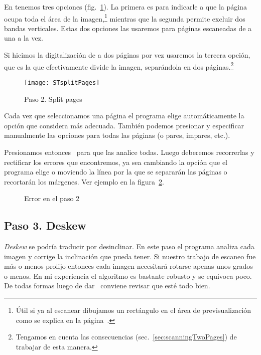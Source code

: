 \documentclass[%
	a5paper,
	10pt,
	twoside,
	openright,
	final,
]{memoir}
\begin{document}
{	En  tenemos tres opciones (fig.~\ref{fig:STsplitPages}). La primera es para indicarle a \scantailor que la página ocupa toda el área de la imagen,\footnote{Útil si ya al escanear dibujamos un rectángulo en el área de previsualización como se explica en la página~\pageref{pag:scanningRegionSelection}.} mientras que la segunda permite excluir dos bandas verticales. Estas dos opciones las usaremos para páginas escaneadas de a una a la vez.

	Si hicimos la digitalización de a dos páginas por vez usaremos la tercera opción, que es la que efectivamente divide la imagen, separándola en dos páginas.\footnote{Tengamos en cuenta las consecuencias (sec.~\ref{sec:scanningTwoPages}) de trabajar de esta manera.}

	\begin{figure}
		\centering
		\texttt{[image: STsplitPages]}
		\caption{Paso 2. Split pages\label{fig:STsplitPages}}
	\end{figure}

	Cada vez que seleccionamos una página el programa elige automáticamente la opción que considera más adecuada. También podemos presionar  y especificar manualmente las opciones para todas las páginas (o pares, impares, etc.).

	Presionamos entonces \play\ para que las analice todas. Luego deberemos recorrerlas y rectificar los errores que encontremos, ya sea cambiando la opción que el programa elige o moviendo la línea por la que se separarán las páginas o recortarán los márgenes. Ver ejemplo en la figura~\ref{fig:STsplitPagesError}.

	\begin{figure}
		\centering
		\hfill
		\caption{Error en el paso 2\label{fig:STsplitPagesError}}
	\end{figure}

	\subsection{Paso 3. Deskew\label{sec:STdeskew}} \emph{Deskew} se podría traducir por desinclinar. En este paso el programa analiza cada imagen y corrige la inclinación que pueda tener. Si nuestro trabajo de escaneo fue más o menos prolijo entonces cada imagen necesitará rotarse apenas unos grados o menos. En mi experiencia el algoritmo es bastante robusto y se equivoca poco. De todas formas luego de dar \play\ conviene revisar que esté todo bien.

}
\end{document}
